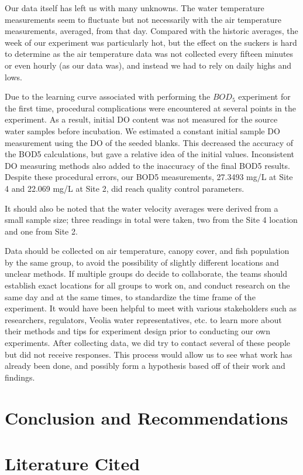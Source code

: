 \documentclass{article}\usepackage[]{graphicx}\usepackage[]{color}
\begin{document}
Our data itself has left us with many unknowns. The water temperature measurements seem to fluctuate but not necessarily with the air temperature measurements, averaged, from that day. Compared with the historic averages, the week of our experiment was particularly hot, but the effect on the suckers is hard to determine as the air temperature data was not collected every fifteen minutes or even hourly (as our data was), and instead we had to rely on daily highs and lows. 

Due to the learning curve associated with performing the $BOD_5$ experiment for the first time, procedural complications were encountered at several points in the experiment. As a result, initial DO content was not measured for the source water samples before incubation. We estimated a constant initial sample DO measurement using the DO of the seeded blanks. This decreased the accuracy of the BOD5 calculations, but gave a relative idea of the initial values. Inconsistent DO measuring methods also added to the inaccuracy of the final BOD5 results. Despite these procedural errors, our BOD5 measurements, 27.3493 mg/L at Site 4 and 22.069 mg/L at Site 2, did reach quality control parameters.

It should also be noted that the water velocity averages were derived from a small sample size; three readings in total were taken, two from the Site 4 location and one from Site 2.

Data should be collected on air temperature, canopy cover, and fish population by the same group, to avoid the possibility of slightly different locations and unclear methods. If multiple groups do decide to collaborate, the teams should establish exact locations for all groups to work on, and conduct research on the same day and at the same times, to standardize the time frame of the experiment. It would have been helpful to meet with various stakeholders such as researchers, regulators, Veolia water representatives, etc. to learn more about their methods and tips for experiment design prior to conducting our own experiments. After collecting data, we did try to contact several of these people but did not receive responses. This process would allow us to see what work has already been done, and possibly form a hypothesis based off of their work and findings.
\section{Conclusion and Recommendations}


\section{Literature Cited}
\end{document}
